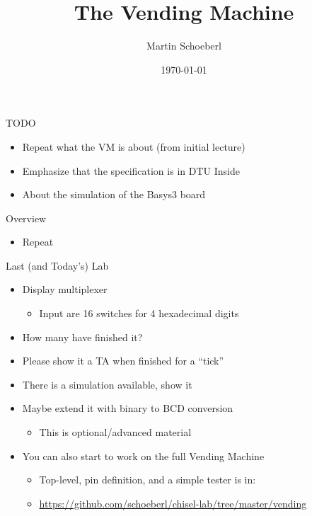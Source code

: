

\newif\ifbook


\title{The Vending Machine}
\author{Martin Schoeberl}
\date{\today}



\begin{frame}
\titlepage
\end{frame}


\begin{frame}[fragile]{TODO}
\begin{itemize}
\item Repeat what the VM is about (from initial lecture)
\item Emphasize that the specification is in DTU Inside
\item About the simulation of the Basys3 board
\end{itemize}
\end{frame}

\begin{frame}[fragile]{Overview}
\begin{itemize}
\item Repeat
\end{itemize}
\end{frame}

\begin{frame}[fragile]{Last (and Today's) Lab}
\begin{itemize}
\item Display multiplexer
\begin{itemize}
\item Input are 16 switches for 4 hexadecimal digits
\end{itemize}
\item How many have finished it?
\item Please show it a TA when finished for a ``tick''
\item There is a simulation available, show it
\item Maybe extend it with binary to BCD conversion
\begin{itemize}
\item This is optional/advanced material
\end{itemize}
\item You can also start to work on the full Vending Machine
\begin{itemize}
\item Top-level, pin definition, and a simple tester is in:
\item \url{https://github.com/schoeberl/chisel-lab/tree/master/vending}
\end{itemize}
\end{itemize}
\end{frame}


